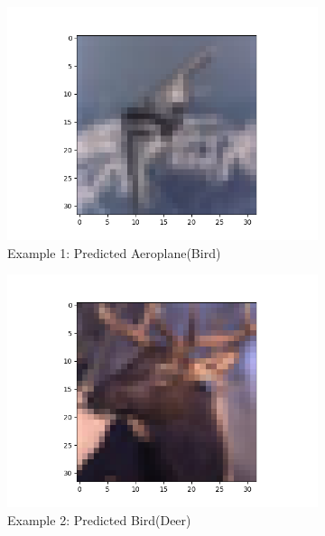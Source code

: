 \documentclass[11pt]{article}
\begin{document}
\begin{figure}[H]
    \begin{subfigure}[b]{0.3\textwidth}
        \centering
        \includegraphics[width=\linewidth]{misA1.png}
        \caption{Example 1: Predicted Aeroplane(Bird)}
    \end{subfigure} 
    \begin{subfigure}[b]{0.3\textwidth}
        \centering
        \includegraphics[width=\linewidth]{misA2.png}
        \caption{Example 2: Predicted Bird(Deer)}
    \end{subfigure} 
    \begin{subfigure}[b]{0.3\textwidth}
        \centering

\end{subfigure}
\end{figure}
\end{document}
